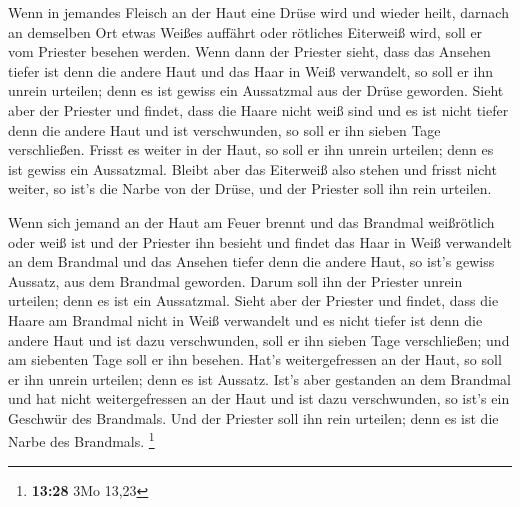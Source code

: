  Wenn in jemandes Fleisch an der Haut eine Drüse wird und
wieder heilt,  darnach an demselben Ort etwas Weißes
auffährt oder rötliches Eiterweiß wird, soll er vom Priester besehen
werden.  Wenn dann der Priester sieht, dass das Ansehen
tiefer ist denn die andere Haut und das Haar in Weiß verwandelt, so soll
er ihn unrein urteilen; denn es ist gewiss ein Aussatzmal aus der Drüse
geworden.  Sieht aber der Priester und findet, dass die
Haare nicht weiß sind und es ist nicht tiefer denn die andere Haut und
ist verschwunden, so soll er ihn sieben Tage verschließen.
 Frisst es weiter in der Haut, so soll er ihn unrein
urteilen; denn es ist gewiss ein Aussatzmal.  Bleibt aber
das Eiterweiß also stehen und frisst nicht weiter, so ist's die Narbe
von der Drüse, und der Priester soll ihn rein urteilen.

 Wenn sich jemand an der Haut am Feuer brennt und das
Brandmal weißrötlich oder weiß ist  und der Priester ihn
besieht und findet das Haar in Weiß verwandelt an dem Brandmal und das
Ansehen tiefer denn die andere Haut, so ist's gewiss Aussatz, aus dem
Brandmal geworden. Darum soll ihn der Priester unrein urteilen; denn es
ist ein Aussatzmal.  Sieht aber der Priester und findet,
dass die Haare am Brandmal nicht in Weiß verwandelt und es nicht tiefer
ist denn die andere Haut und ist dazu verschwunden, soll er ihn sieben
Tage verschließen;  und am siebenten Tage soll er ihn
besehen. Hat's weitergefressen an der Haut, so soll er ihn unrein
urteilen; denn es ist Aussatz.  Ist's aber gestanden an
dem Brandmal und hat nicht weitergefressen an der Haut und ist dazu
verschwunden, so ist's ein Geschwür des Brandmals. Und der Priester soll
ihn rein urteilen; denn es ist die Narbe des Brandmals. \footnote{\textbf{13:28}
  3Mo 13,23}

